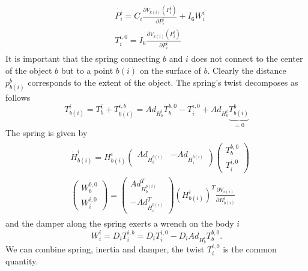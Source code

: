 \documentclass[a4paper,twoside, openright,12pt]{report}
\begin{document}
\begin{eqnarray}
\begin{aligned}
	&\dot{P_i^i} = C_i \frac{\partial V_{k(i)}(P_i^i)}{\partial P_i^i} + I_6 W_{i}^i \\
	&T_i^{i,0} = I_6 \frac{\partial V_{k(i)}(P_i^i)}{\partial P_i^i}
\end{aligned}
\end{eqnarray}
It is important that the spring connecting $b$ and $i$ does not connect to the center of the object $b$ but to a point $b(i)$ on the surface of $b$. Clearly the distance $p_{b(i)}^b$ corresponds to the extent of the object. The spring's twist decomposes as follows
\begin{equation}
T_{b(i)}^i = T_b^i + T_{b(i)}^{i,b} = Ad_{H_b^i} T_b^{b,0} - T_i^{i,0} + Ad_{H_b^i}\underbrace{T_{b(i)}^b}_{=0}
\end{equation}
The spring is given by    
\begin{eqnarray}
\begin{aligned}
&\dot{H}_{b(i)}^i = H_{b(i)}^i \begin{pmatrix}
Ad_{H_b^{b(i)}} & - Ad_{H_i^{b(i)}} \end{pmatrix} \begin{pmatrix} 
T_b^{b,0} \\ T_i^{i,0}\end{pmatrix}\\
&\begin{pmatrix} 
W_b^{b,0} \\ W_i^{i,0} \end{pmatrix} = \begin{pmatrix}
Ad_{H_b^{b(i)}}^T \\ - Ad_{H_i^{b(i)}}^T\end{pmatrix}
(H_{b(i)}^i)^T
\frac{\partial V_{s(i)}}{\partial H_{b(i)}^i}
\end{aligned}
\end{eqnarray}
and the damper along the spring exerts a wrench on the body $i$
\begin{equation}
W_i^i = D_i T_i^{i,b} = D_i T_i^{i,0} - D_i Ad_{H_b^i} T_b^{b,0}.
\end{equation}
We can combine spring, inertia and damper, the twist $T_i^{i,0}$ is the common quantity.
\end{document}
